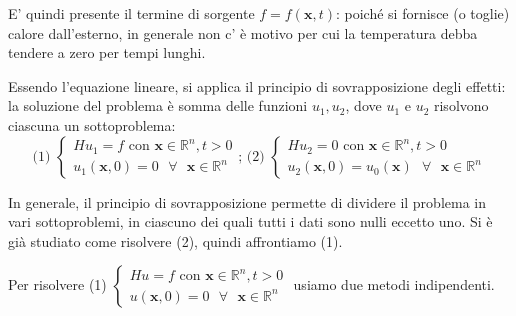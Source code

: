 \documentclass{article}
\begin{document}
E' quindi presente il termine di sorgente $f=f\left( \mathbf{x},t\right) $:
poich\'{e} si fornisce (o toglie) calore dall'esterno, in generale non c'%
\`{e} motivo per cui la temperatura debba tendere a zero per tempi lunghi.

Essendo l'equazione lineare, si applica il principio di sovrapposizione
degli effetti: la soluzione del problema \`{e} somma delle funzioni $%
u_{1},u_{2}$, dove $u_{1}$ e $u_{2}$ risolvono ciascuna un sottoproblema:%
\begin{equation*}
\text{(1) }\left\{ 
\begin{array}{c}
Hu_{1}=f\text{ con }\mathbf{x}\in 
\mathbb{R}
^{n},t>0 \\ 
u_{1}\left( \mathbf{x},0\right) =0\text{ }\forall \text{ }\mathbf{x}\in 
\mathbb{R}
^{n}%
\end{array}%
\right. \text{; (2) }\left\{ 
\begin{array}{c}
Hu_{2}=0\text{ con }\mathbf{x}\in 
\mathbb{R}
^{n},t>0 \\ 
u_{2}\left( \mathbf{x},0\right) =u_{0}\left( \mathbf{x}\right) \text{ }%
\forall \text{ }\mathbf{x}\in 
\mathbb{R}
^{n}%
\end{array}%
\right.
\end{equation*}

In generale, il principio di sovrapposizione permette di dividere il
problema in vari sottoproblemi, in ciascuno dei quali tutti i dati sono
nulli eccetto uno. Si \`{e} gi\`{a} studiato come risolvere (2), quindi
affrontiamo (1).

Per risolvere (1) $\left\{ 
\begin{array}{c}
Hu=f\text{ con }\mathbf{x}\in 
\mathbb{R}
^{n},t>0 \\ 
u\left( \mathbf{x},0\right) =0\text{ }\forall \text{ }\mathbf{x}\in 
\mathbb{R}
^{n}%
\end{array}%
\right. $ usiamo due metodi indipendenti.
\end{document}
